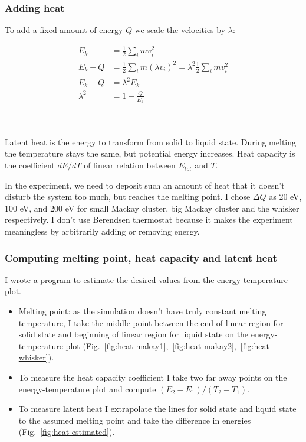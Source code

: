 \documentclass[12pt,a4paper]{article}
\newcommand{\framed}[1]{\tikz[baseline=(char.base)]{\node[shape=rectangle,draw,inner sep=4pt] (char) {#1};}}
\begin{document}
\clearpage

\subsubsection*{Adding heat}

To add a fixed amount of energy $Q$ we scale the velocities by $\lambda$:

\[
\begin{aligned}
	E_k &= \frac{1}{2} \sum_i m v_i^2 \\
	E_k + Q &= \frac{1}{2} \sum_i m (\lambda v_i)^2 = \lambda^2 \frac{1}{2} \sum_i m v_i^2 \\
	E_k + Q &= \lambda^2 E_k \\
	\lambda^2 &= 1 + \frac{Q}{E_k} \\
\end{aligned}
\]

{\centering\framed{ \( \lambda = \sqrt{1 + \frac{Q}{E_k}} \) }\\}

Latent heat is the energy to transform from solid to liquid state. During melting the temperature stays the same, but potential energy increases. Heat capacity is the coefficient $dE/dT$ of linear relation between $E_{tot}$ and $T$.

In the experiment, we need to deposit such an amount of heat that it doesn't disturb the system too much, but reaches the melting point. I chose $\Delta Q$ as 20 eV, 100 eV, and 200 eV for small Mackay cluster, big Mackay cluster and the whisker respectively. I don't use Berendsen thermostat because it makes the experiment meaningless by arbitrarily adding or removing energy.

\subsubsection*{Computing melting point, heat capacity and latent heat}
I wrote a program to estimate the desired values from the energy-temperature plot.

\begin{itemize}
	\item Melting point: as the simulation doesn't have truly constant melting temperature, I take the middle point between the end of linear region for solid state and beginning of linear region for liquid state on the energy-temperature plot (Fig.~\ref{fig:heat-makay1},~\ref{fig:heat-makay2},~\ref{fig:heat-whisker}).
	\item To measure the heat capacity coefficient I take two far away points on the energy-temperature plot and compute $(E_2-E_1)/(T_2-T_1)$.
	\item To measure latent heat I extrapolate the lines for solid state and liquid state to the assumed melting point and take the difference in energies (Fig.~\ref{fig:heat-estimated}).
\end{itemize}
\end{document}
